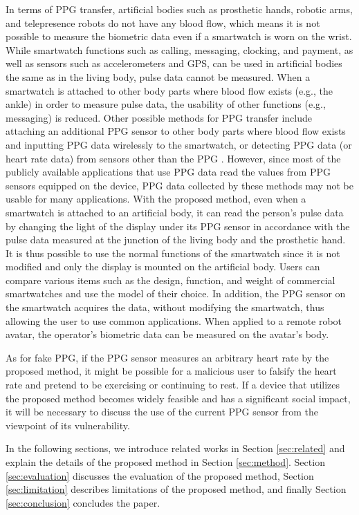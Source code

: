 \documentclass[sigchi,authordraft]{acmart}
\begin{document}
In terms of PPG transfer, artificial bodies such as prosthetic hands, robotic arms, and telepresence robots do not have any blood flow, which means it is not possible to measure the biometric data even if a smartwatch is worn on the wrist. While smartwatch functions such as calling, messaging, clocking, and payment, as well as sensors such as accelerometers and GPS, can be used in artificial bodies the same as in the living body, pulse data cannot be measured. When a smartwatch is attached to other body parts where blood flow exists (e.g., the ankle) in order to measure pulse data, the usability of other functions (e.g., messaging) is reduced. Other possible methods for PPG transfer include attaching an additional PPG sensor to other body parts where blood flow exists and inputting PPG data wirelessly to the smartwatch, or detecting PPG data (or heart rate data) from sensors other than the PPG \cite{Biowatch, heart_rate_accelerometer, SeismoTracker}. However, since most of the publicly available applications that use PPG data read the values from PPG sensors equipped on the device, PPG data collected by these methods may not be usable for many applications. With the proposed method, even when a smartwatch is attached to an artificial body, it can read the person's pulse data by changing the light of the display under its PPG sensor in accordance with the pulse data measured at the junction of the living body and the prosthetic hand. It is thus possible to use the normal functions of the smartwatch since it is not modified and only the display is mounted on the artificial body. Users can compare various items such as the design, function, and weight of commercial smartwatches and use the model of their choice. In addition, the PPG sensor on the smartwatch acquires the data, without modifying the smartwatch, thus allowing the user to use common applications. When applied to a remote robot avatar, the operator's biometric data can be measured on the avatar's body.\par

As for fake PPG, if the PPG sensor measures an arbitrary heart rate by the proposed method, it might be possible for a malicious user to falsify the heart rate and pretend to be exercising or continuing to rest. If a device that utilizes the proposed method becomes widely feasible and has a significant social impact, it will be necessary to discuss the use of the current PPG sensor from the viewpoint of its vulnerability.\par

In the following sections, we introduce related works in Section \ref{sec:related} and explain the details of the proposed method in Section \ref{sec:method}. Section \ref{sec:evaluation} discusses the evaluation of the proposed method, Section \ref{sec:limitation} describes limitations of the proposed method, and finally Section \ref{sec:conclusion} concludes the paper.
\end{document}
